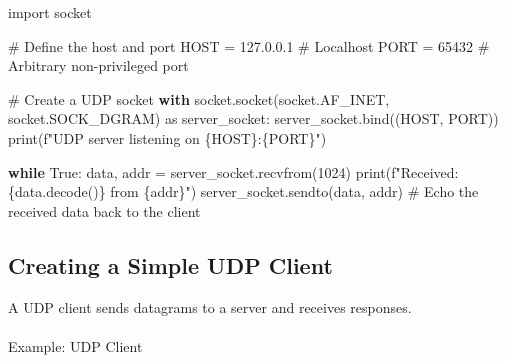 \documentclass[
  letterpaper,
  DIV=11,
  numbers=noendperiod]{scrreprt}
\makeatletter
\let\oldparagraph\paragraph
\renewcommand{\paragraph}{
    \@ifstar
      \xxxParagraphStar
      \xxxParagraphNoStar
  }
\newcommand{\xxxParagraphStar}[1]{\oldparagraph*{#1}\mbox{}}
\newcommand{\xxxParagraphNoStar}[1]{\oldparagraph{#1}\mbox{}}
\newenvironment{Shaded}{\begin{snugshade}}{\end{snugshade}}
\newcommand{\BuiltInTok}[1]{\textcolor[rgb]{0.00,0.23,0.31}{#1}}
\newcommand{\CommentTok}[1]{\textcolor[rgb]{0.37,0.37,0.37}{#1}}
\newcommand{\ControlFlowTok}[1]{\textcolor[rgb]{0.00,0.23,0.31}{\textbf{#1}}}
\newcommand{\DecValTok}[1]{\textcolor[rgb]{0.68,0.00,0.00}{#1}}
\newcommand{\ImportTok}[1]{\textcolor[rgb]{0.00,0.46,0.62}{#1}}
\newcommand{\NormalTok}[1]{\textcolor[rgb]{0.00,0.23,0.31}{#1}}
\newcommand{\OperatorTok}[1]{\textcolor[rgb]{0.37,0.37,0.37}{#1}}
\newcommand{\SpecialCharTok}[1]{\textcolor[rgb]{0.37,0.37,0.37}{#1}}
\newcommand{\SpecialStringTok}[1]{\textcolor[rgb]{0.13,0.47,0.30}{#1}}
\newcommand{\StringTok}[1]{\textcolor[rgb]{0.13,0.47,0.30}{#1}}
\newcommand{\VariableTok}[1]{\textcolor[rgb]{0.07,0.07,0.07}{#1}}
\makeatother
\begin{document}
\begin{Shaded}
\begin{Highlighting}[]
\ImportTok{import}\NormalTok{ socket}

\CommentTok{\# Define the host and port}
\NormalTok{HOST }\OperatorTok{=} \StringTok{\textquotesingle{}127.0.0.1\textquotesingle{}}  \CommentTok{\# Localhost}
\NormalTok{PORT }\OperatorTok{=} \DecValTok{65432}        \CommentTok{\# Arbitrary non{-}privileged port}

\CommentTok{\# Create a UDP socket}
\ControlFlowTok{with}\NormalTok{ socket.socket(socket.AF\_INET, socket.SOCK\_DGRAM) }\ImportTok{as}\NormalTok{ server\_socket:}
\NormalTok{    server\_socket.bind((HOST, PORT))}
    \BuiltInTok{print}\NormalTok{(}\SpecialStringTok{f"UDP server listening on }\SpecialCharTok{\{}\NormalTok{HOST}\SpecialCharTok{\}}\SpecialStringTok{:}\SpecialCharTok{\{}\NormalTok{PORT}\SpecialCharTok{\}}\SpecialStringTok{"}\NormalTok{)}

    \ControlFlowTok{while} \VariableTok{True}\NormalTok{:}
\NormalTok{        data, addr }\OperatorTok{=}\NormalTok{ server\_socket.recvfrom(}\DecValTok{1024}\NormalTok{)}
        \BuiltInTok{print}\NormalTok{(}\SpecialStringTok{f"Received: }\SpecialCharTok{\{}\NormalTok{data}\SpecialCharTok{.}\NormalTok{decode()}\SpecialCharTok{\}}\SpecialStringTok{ from }\SpecialCharTok{\{}\NormalTok{addr}\SpecialCharTok{\}}\SpecialStringTok{"}\NormalTok{)}
\NormalTok{        server\_socket.sendto(data, addr)  }\CommentTok{\# Echo the received data back to the client}
\end{Highlighting}
\end{Shaded}

\subsection{Creating a Simple UDP
Client}\label{creating-a-simple-udp-client}

A UDP client sends datagrams to a server and receives responses.

\paragraph{Example: UDP Client}\label{example-udp-client}
\end{document}
